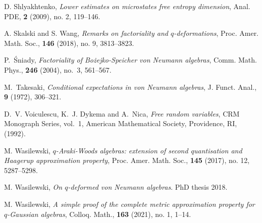 \documentclass[12pt, a4paper,reqno]{amsart}
\theoremstyle{definition}
\begin{document}
\begin{thebibliography}{}
D. Shlyakhtenko, \emph{Lower estimates on microstates free entropy dimension},
Anal. PDE, \textbf{2} (2009), no. 2, 119--146.

A. Skalski and S. Wang, \emph{Remarks on factoriality and {$q$}-deformations},
Proc. Amer. Math. Soc., \textbf{146} (2018), no. 9, 3813--3823.
	
P.~{\'S}niady, \emph{Factoriality of {B}o\.zejko-{S}peicher von {N}eumann algebras}, Comm. Math. Phys., \textbf{246} (2004), no.~3, 561--567.
	
M.~Takesaki, \emph{Conditional expectations in von {N}eumann algebras}, J.
Funct. Anal., \textbf{9} (1972), 306--321. 
	
D.~V. Voiculescu, K.~J. Dykema and A.~Nica, \emph{Free random variables}, CRM Monograph Series, vol.~1, American Mathematical Society, Providence, RI, (1992). 
	
M. Wasilewski, \emph{{$q$}-{A}raki-{W}oods algebras: extension of second quantisation and {H}aagerup approximation property}, Proc. Amer. Math. Soc., \textbf{145} (2017), no. 12, 5287--5298.
	
M. Wasilewski, \emph{On $q$-deformed von Neumann algebras}. PhD thesis 2018.

M. Wasilewski, \emph{A simple proof of the complete metric approximation property for {$q$}-{G}aussian algebras}, Colloq. Math., \textbf{163} (2021), no. 1, 1--14.
\end{thebibliography}
\end{document}
